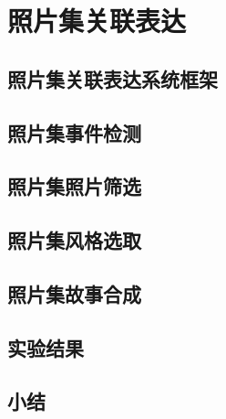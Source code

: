 \chapter{照片集关联表达}
\section{照片集关联表达系统框架}
\section{照片集事件检测}
\section{照片集照片筛选}
\section{照片集风格选取}
\section{照片集故事合成}
\section{实验结果}
\section{小结}

